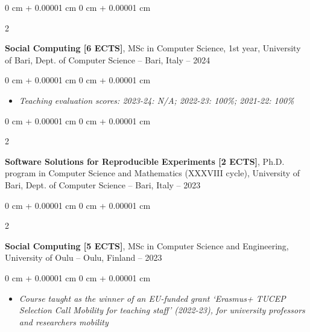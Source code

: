 \documentclass[10pt, a4paper]{article}
\newenvironment{highlights}{
    \begin{itemize}[
        topsep=0.10 cm,
        parsep=0.10 cm,
        partopsep=0pt,
        itemsep=0pt,
        leftmargin=0 cm + 10pt
    ]
}{
    \end{itemize}
} %
\newenvironment{onecolentry}{
    \begin{adjustwidth}{
        0 cm + 0.00001 cm
    }{
        0 cm + 0.00001 cm
    }
}{
    \end{adjustwidth}
} %
\newenvironment{twocolentry}[2][]{
    \onecolentry
    \def\secondColumn{#2}
    \setcolumnwidth{\fill, 4.5 cm}
    \begin{paracol}{2}
}{
    \switchcolumn \raggedleft \secondColumn
    \end{paracol}
    \endonecolentry
} %
\begin{document}
        \vspace{0.2 cm}

        \begin{twocolentry}{
            2021 – 2024
        }
            \textbf{Social Computing [6 ECTS]}, MSc in Computer Science, 1st year, University of Bari, Dept. of Computer Science -- Bari, Italy\end{twocolentry}

        \vspace{0.10 cm}
        \begin{onecolentry}
            \begin{highlights}
                \item \textit{Teaching evaluation scores: 2023-24: N/A; 2022-23: 100\%; 2021-22: 100\%}
            \end{highlights}
        \end{onecolentry}


        \vspace{0.2 cm}

        \begin{twocolentry}{
            2022 – 2023
        }
            \textbf{Software Solutions for Reproducible Experiments [2 ECTS]}, Ph.D. program in Computer Science and Mathematics (XXXVIII cycle), University of Bari, Dept. of Computer Science -- Bari, Italy\end{twocolentry}



        \vspace{0.2 cm}

        \begin{twocolentry}{
            2022 – 2023
        }
            \textbf{Social Computing [5 ECTS]}, MSc in Computer Science and Engineering, University of Oulu -- Oulu, Finland\end{twocolentry}

        \vspace{0.10 cm}
        \begin{onecolentry}
            \begin{highlights}
                \item \textit{Course taught as the winner of an EU-funded grant `Erasmus+ TUCEP Selection Call Mobility for teaching staff' (2022-23), for university professors and researchers mobility}
            \end{highlights}
        \end{onecolentry}


        \vspace{0.2 cm}
\end{document}
